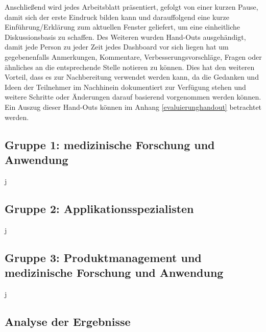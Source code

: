 Anschließend wird jedes Arbeitsblatt präsentiert, gefolgt von einer kurzen Pause, damit sich der erste Eindruck bilden kann und darauffolgend eine kurze Einführung/Erklärung zum aktuellen Fenster geliefert, um eine einheitliche Diskussionsbasis zu schaffen.
Des Weiteren wurden Hand-Outs ausgehändigt, damit jede Person zu jeder Zeit jedes Dashboard vor sich liegen hat um gegebenenfalls Anmerkungen, Kommentare, Verbesserungsvorschläge, Fragen oder ähnliches an die entsprechende Stelle notieren zu können.
Dies hat den weiteren Vorteil, dass es zur Nachbereitung verwendet werden kann, da die Gedanken und Ideen der Teilnehmer im Nachhinein dokumentiert zur Verfügung stehen und weitere Schritte oder Änderungen darauf basierend vorgenommen werden können. 
Ein Auszug dieser Hand-Outs können im Anhang \ref{evaluierunghandout} betrachtet werden.

\subsection{Gruppe 1: medizinische Forschung und Anwendung}
j
\subsection{Gruppe 2: Applikationsspezialisten}
j
\subsection{Gruppe 3: Produktmanagement und medizinische Forschung und Anwendung}
j


\subsection{Analyse der Ergebnisse}
